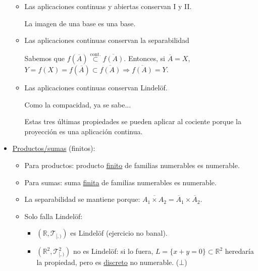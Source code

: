 \begin{demo}
\begin{itemize}
\begin{itemize}
        \item Las aplicaciones continuas y abiertas conservan I y II.
        \begin{demo}
            La imagen de una base es una base.
        \end{demo}
        \item Las aplicaciones continuas conservan la separabilidad 
        \begin{demo}
            Sabemos que $f\left( \overline{A} \right) \stackrel{\text{cont.}}{\subset} \overline{f\left( A \right)}$. Entonces, si $\overline{A} = X$, $Y = f\left( X \right) = f\left( \overline{A} \right) \subset \overline{f\left( A \right)} \Rightarrow \overline{f\left( A \right)} = Y$.
        \end{demo}
        \item Las aplicaciones continuas conservan Lindelöf. 
        \begin{demo}
            Como la compacidad, ya se sabe...
        \end{demo}

        Estas tres últimas propiedades se pueden aplicar al cociente porque la proyección es una aplicación continua.
    \end{itemize}

    \item \underline{Productos/sumas} (finitos):
    \begin{itemize}
        \item Para productos: producto \underline{finito} de familias numerables es numerable.
        \item Para sumas: suma \underline{finita} de familias numerables es numerable.
        \item La separabilidad se mantiene porque: $\overline{A_1 \times A_2} = \overline{A}_1 \times \overline{A}_2$.
        \item Solo falla Lindelöf:
        \begin{itemize}
            \item $\left( \mathbb{R}, \mathcal{T}_{[, )} \right)$ es Lindelöf (ejercicio no banal).
            \item $\left( \mathbb{R}^2, \mathcal{T}_{[, )}^2 \right)$ no es Lindelöf: si lo fuera, $L = \{x + y = 0\} \subset \mathbb{R}^2$ heredaría la propiedad, pero es \underline{discreto} no numerable. ($\bot$)
        \end{itemize}
    \end{itemize}
\end{itemize} 
\end{demo}


